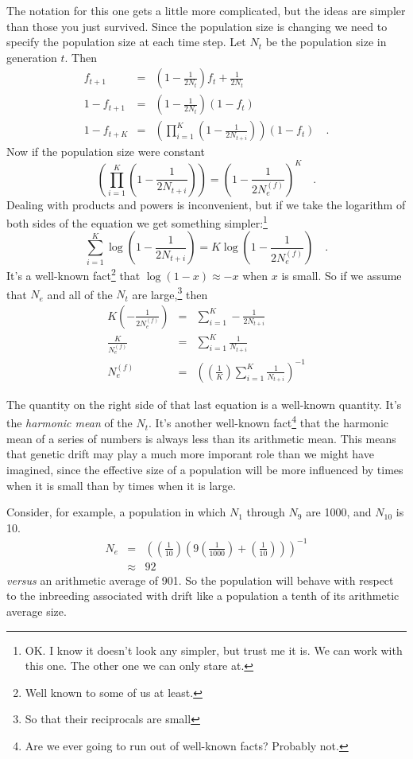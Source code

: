 The notation for this one gets a little more complicated, but the
ideas are simpler than those you just survived. Since the population
size is changing we need to specify the population size at each time
step. Let $N_t$ be the population size in generation $t$. Then
\begin{eqnarray*}
f_{t+1} &=& \left(1-\frac{1}{2N_t}\right)f_t + \frac{1}{2N_t} \\
1 - f_{t+1} &=& \left(1-\frac{1}{2N_t}\right)(1-f_t) \\
1 - f_{t+K} &=&
\left(\prod_{i=1}^K\left(1-\frac{1}{2N_{t+i}}\right)\right)(1-f_t) \quad .
\end{eqnarray*}
Now if the population size were constant
\[
\left(\prod_{i=1}^K\left(1-\frac{1}{2N_{t+i}}\right)\right) =
\left(1 - \frac{1}{2N_e^{(f)}}\right)^K \quad .
\]
Dealing with products and powers is inconvenient, but if we take the
logarithm of both sides of the equation we get something
simpler:\footnote{OK. I know it doesn't look any simpler, but trust me
  it is. We can work with this one. The other one we can only stare
  at.} 
\[
\sum_{i=1}^K\log\left(1-\frac{1}{2N_{t+i}}\right) =
K\log\left(1 - \frac{1}{2N_e^{(f)}}\right) \quad .
\]
It's a well-known fact\footnote{Well known to some of us at least.}
that $\log(1-x) \approx -x$ when $x$ is small. So if we assume that
$N_e$ and all of the $N_{t}$ are large,\footnote{So that their
  reciprocals are small} then
\begin{eqnarray*}
K\left(-\frac{1}{2N_e^{(f)}}\right)
  &=& \sum_{i=1}^K-\frac{1}{2N_{t+i}} \\
\frac{K}{N_e^{(f)}} &=& \sum_{i=1}^K\frac{1}{N_{t+i}} \\
N_e^{(f)} &=& \left(\left(\frac{1}{K}\right)
                    \sum_{i=1}^K\frac{1}{N_{t+i}}\right)^{-1}
\end{eqnarray*}

The quantity on the right side of that last equation is a well-known
quantity. It's the {\it harmonic mean} of the $N_{t}$.  It's another
well-known fact\footnote{Are we ever going to run out of well-known
  facts? Probably not.} that the harmonic mean of a series of numbers
is always less than its arithmetic mean. This means that genetic drift
may play a much more imporant role than we might have imagined, since
the effective size of a population will be more influenced by times
when it is small than by times when it is large.

Consider, for example, a population in which $N_1$ through $N_9$ are
1000, and $N_{10}$ is 10.
\begin{eqnarray*}
N_e &=& \left(\left(\frac{1}{10}\right)
            \left(9\left(\frac{1}{1000}\right) +
                   \left(\frac{1}{10}\right)\right)\right)^{-1} \\
    &\approx& 92
\end{eqnarray*}
{\it versus\/} an arithmetic average of 901. So the population will
behave with respect to the inbreeding associated with drift like a
population a tenth of its arithmetic average size.

